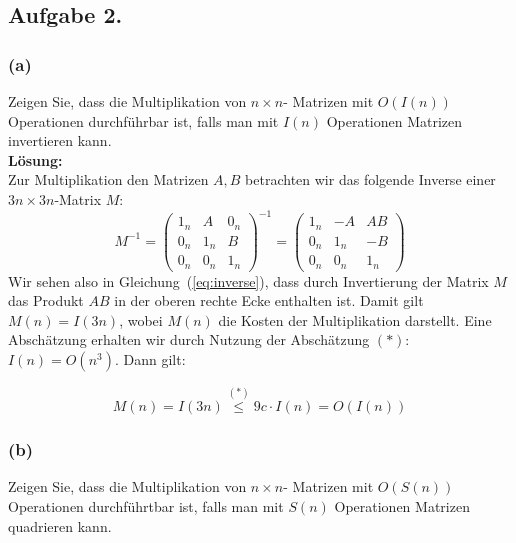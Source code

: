 \documentclass[11pt,a4paper,ngerman]{article}
\begin{document}
\subsection*{Aufgabe 2.}

\subsubsection*{(a)}

Zeigen Sie, dass die Multiplikation von $n \times n$- Matrizen mit $O(I(n))$ Operationen durchführbar ist, falls man mit $I(n)$ Operationen Matrizen invertieren kann.\\

\textbf{Lösung:}\\
Zur Multiplikation den Matrizen $A,B$ betrachten wir das folgende Inverse einer $3n \times 3n$-Matrix $M$:
\begin{equation}\label{eq:inverse}
  M^{-1} = \left(\begin{array}{ccc}
              1_n & A   & 0_n \\
              0_n & 1_n & B \\
              0_n & 0_n & 1_n
           \end{array}\right)^{-1}
         = \left(\begin{array}{ccc}
              1_n & -A   & AB \\
              0_n & 1_n & -B \\
              0_n & 0_n & 1_n
           \end{array}\right)
\end{equation}
Wir sehen also in Gleichung~(\ref{eq:inverse}), dass durch Invertierung der Matrix $M$ das Produkt $AB$
in der oberen rechte Ecke enthalten ist. Damit gilt $M(n) = I(3n)$, wobei $M(n)$ die Kosten der Multiplikation
darstellt.
Eine Abschätzung erhalten wir durch Nutzung der Abschätzung $(*)$: $I(n) = O(n^3)$. Dann gilt:

\begin{equation}
  M(n) = I(3n) \stackrel{(*)}{\leq} 9c\cdot I(n) = O(I(n))
\end{equation}
\subsubsection*{(b)}

Zeigen Sie, dass die Multiplikation von $n \times n$- Matrizen mit $O(S(n))$ Operationen durchführtbar ist, falls man mit $S(n)$ Operationen Matrizen quadrieren kann.\\
\end{document}
